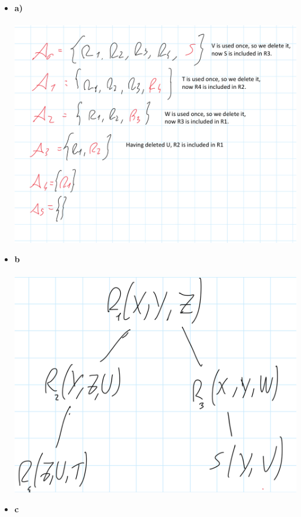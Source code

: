 \documentclass{article}
\begin{document}
\begin{itemize}
\item \textbf{a)}\\\\
\includegraphics[scale=0.2]{10_1.jpg}
\item \textbf{b}\\\\
\includegraphics[scale=0.1]{10_2.jpg}
\item \textbf{c}\\\\

\end{itemize}
\end{document}
